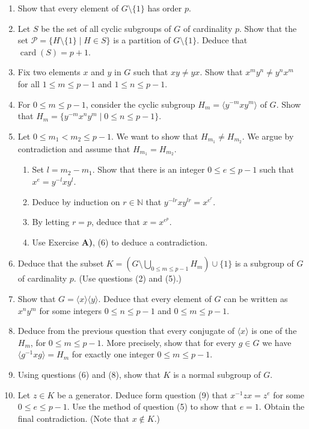 \documentclass[12pt,a4paper]{article}
\begin{document}
\begin{enumerate}
\item[(1)] Show that every element of $G\setminus\{1\}$ has order $p$.
\item[(2)] Let $S$ be the set of all cyclic subgroups of $G$ of cardinality $p$. Show that the set $\mathcal{P}=\{H\setminus\{1\}\mid H\in S\}$ is a partition of $G\setminus\{1\}$. Deduce that $\operatorname{card}(S)=p+1$.
\item[(3)] Fix two elements $x$ and $y$ in $G$ such that $xy\neq yx$. Show that $x^m y^n\neq y^n x^m$ for all $1\leq m\leq p-1$ and $1\leq n\leq p-1$.
\item[(4)] For $0\leq m\leq p-1$, consider the cyclic subgroup $H_m=\langle y^{-m}xy^m\rangle$ of $G$. Show that $H_m=\{y^{-m}x^n y^m\mid 0\leq n\leq p-1\}$.
\item[(5)] Let $0\leq m_1<m_2\leq p-1$. We want to show that $H_{m_1}\neq H_{m_2}$. We argue by contradiction and assume that $H_{m_1}=H_{m_2}$.
\begin{enumerate}
\item[(a)] Set $l=m_2-m_1$. Show that there is an integer $0\leq e\leq p-1$ such that $x^e=y^{-l}xy^l$.
\item[(b)] Deduce by induction on $r\in\mathbb{N}$ that $y^{-lr}xy^{lr}=x^{e^r}$.
\item[(c)] By letting $r=p$, deduce that $x=x^{e^p}$.
\item[(d)] Use Exercise \textbf{A)}, (6) to deduce a contradiction.
\end{enumerate}
\item[(6)] Deduce that the subset $K=(G\setminus\bigcup_{0\leq m\leq p-1}H_m)\cup\{1\}$ is a subgroup of $G$ of cardinality $p$. (Use questions (2) and (5).)
\item[(7)] Show that $G=\langle x\rangle\langle y\rangle$. Deduce that every element of $G$ can be written as $x^n y^m$ for some integers $0\leq n\leq p-1$ and $0\leq m\leq p-1$.
\item[(8)] Deduce from the previous question that every conjugate of $\langle x\rangle$ is one of the $H_m$, for $0\leq m\leq p-1$. More precisely, show that for every $g\in G$ we have $\langle g^{-1}xg\rangle=H_m$ for exactly one integer $0\leq m\leq p-1$.
\item[(9)] Using questions (6) and (8), show that $K$ is a normal subgroup of $G$.
\item[(10)] Let $z\in K$ be a generator. Deduce form question (9) that $x^{-1}zx=z^e$ for some $0\leq e\leq p-1$. Use the method of question (5) to show that $e=1$. Obtain the final contradiction. (Note that $x\notin K$.)
\end{enumerate}
\end{document}
